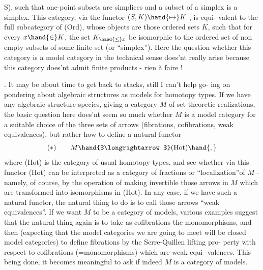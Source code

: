 
S),  such that one-point subsets are simplices and a subset of a simplex
is a simplex.  This category,  via the functor   $(S,K)\hand{\mapsto} K$ ,  is equi-%
valent to the full subcategory of (Ord),  whose objects are those ordered
sets $K$,  such that for every $x\hand{\in}K$,  the set $K_{\hand{\leq}x}$  be isomorphic to the
ordered set of  non empty subsets of some finite set (or ``simplex'').
Here  the question  whether  this category is a model category
in the technical sense \inserted{[of Quillen]} does'nt really arise\hand{,} because this category
does'nt  admit finite products -  rien à faire !

.  It may be about time to get back to stacks,  still I can't help go-%
ing on pondering about algebraic structures as models for homotopy types.
If we have any algebraic structure species,  giving  a category $M$ of
set-theoretic realizations,  the basic question here does'nt seem so
much whether $M$ is a model category for a suitable choice of the three
sets of arrows (fibrations,  cofibrations,  weak equivalences),  but
rather how to define a natural functor
\[ (*) \qquad M \hand{$\longrightarrow$} (\mathrm{Hot}) \hand{,} \]
where (Hot) is the category of usual homotopy types,  and see whether
via this functor (Hot) can be interpreted as a category of fractions
\hand{(}or ``localization''\hand{)}of $M$  -  namely,  of course,  by the operation of making
invertible those arrows in $M$ which are transformed into isomorphisms
in (Hot).  In any case,  if we have such a natural functor,  the natural
thing to do is to call those arrows ``weak equivalences''.  If we want $M$
to be a category of models,  various examples suggest that the natural
thing again is to take as cofibrations the monomorphisms,\hand{,} and then
(expecting that the model categories we are going to meet will be closed
model categories) to define fibrations by the Serre-Quillen lifting pro-%
perty with respect to cofibrations (=monomorphisms) which are weak equi-%
valences.  This being done,  it becomes meaningful to ask if indeed $M$
is a category of models.

